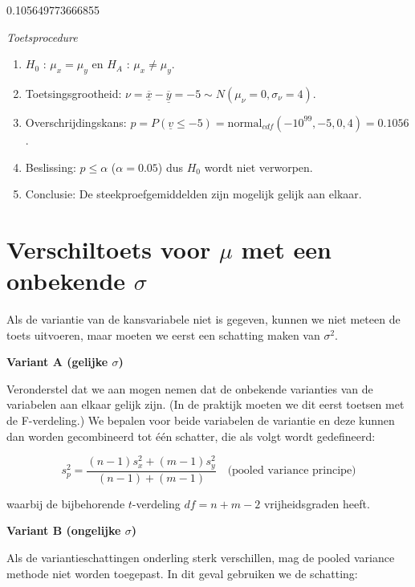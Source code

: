 \documentclass[11pt]{article}
\providecommand{\tightlist}{%
      \setlength{\itemsep}{0pt}\setlength{\parskip}{0pt}}
\begin{document}
    0.105649773666855

    
    \emph{Toetsprocedure}

\begin{enumerate}
\def\labelenumi{\arabic{enumi}.}
\tightlist
\item
  \(H_0\) : \(\mu_x = \mu_y\) en \(H_A\) : \(\mu_x \not= \mu_y\).
\item
  Toetsingsgrootheid:
  \(\nu = \underline{\overline x} - \underline{\overline y} = -5 \sim N(\mu_\nu = 0, \sigma_\nu = 4)\).
\item
  Overschrijdingskans:
  \(p = P(\underline{v} \leq -5) = \textrm{normal}_{cdf}(-10^{99}, -5, 0, 4) = 0.1056\).
\item
  Beslissing: \(p \leq \alpha\) (\(\alpha=0.05\)) dus \(H_0\) wordt niet
  verworpen.
\item
  Conclusie: De steekproefgemiddelden zijn mogelijk gelijk aan elkaar.
\end{enumerate}

    \hypertarget{verschiltoets-voor-mu-met-een-onbekende-sigma}{%
\section{\texorpdfstring{Verschiltoets voor \(\mu\) met een onbekende
\(\sigma\)}{Verschiltoets voor \textbackslash{}mu met een onbekende \textbackslash{}sigma}}\label{verschiltoets-voor-mu-met-een-onbekende-sigma}}

    Als de variantie van de kansvariabele niet is gegeven, kunnen we niet
meteen de toets uitvoeren, maar moeten we eerst een schatting maken van
\(\sigma^2\).

\textbf{Variant A (gelijke \(\sigma\))}

Veronderstel dat we aan mogen nemen dat de onbekende varianties van de
variabelen aan elkaar gelijk zijn. (In de praktijk moeten we dit eerst
toetsen met de F-verdeling.) We bepalen voor beide variabelen de
variantie en deze kunnen dan worden gecombineerd tot één schatter, die
als volgt wordt gedefineerd:

\[s_p^2 = \dfrac{(n-1)s_x^2 + (m-1)s_y^2}{(n-1)+(m-1)} \quad \textrm{(pooled variance principe)}\]

waarbij de bijbehorende \(t\)-verdeling \(df=n+m-2\) vrijheidsgraden
heeft.

    \textbf{Variant B (ongelijke \(\sigma\))}

Als de variantieschattingen onderling sterk verschillen, mag de pooled
variance methode niet worden toegepast. In dit geval gebruiken we de
schatting:
\end{document}
